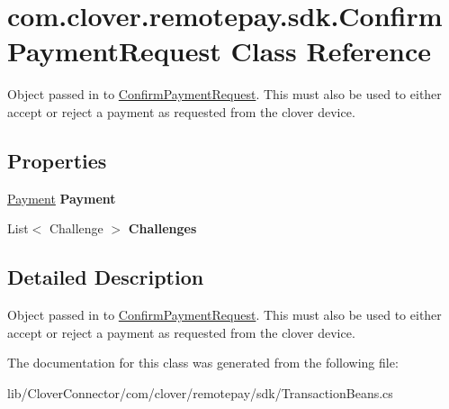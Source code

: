 \hypertarget{classcom_1_1clover_1_1remotepay_1_1sdk_1_1_confirm_payment_request}{}\section{com.\+clover.\+remotepay.\+sdk.\+Confirm\+Payment\+Request Class Reference}
\label{classcom_1_1clover_1_1remotepay_1_1sdk_1_1_confirm_payment_request}


Object passed in to \hyperlink{classcom_1_1clover_1_1remotepay_1_1sdk_1_1_confirm_payment_request}{Confirm\+Payment\+Request}. This must also be used to either accept or reject a payment as requested from the clover device.  


\subsection*{Properties}
\begin{DoxyCompactItemize}
\item 
\mbox{\label{classcom_1_1clover_1_1remotepay_1_1sdk_1_1_confirm_payment_request_ac37c417f349cc5ec5222a8d46ca53a1f}} 
\hyperlink{classcom_1_1clover_1_1sdk_1_1v3_1_1payments_1_1_payment}{Payment} {\bfseries Payment}
\item 
\mbox{\label{classcom_1_1clover_1_1remotepay_1_1sdk_1_1_confirm_payment_request_a6c6a13c89a0eee65abc066295e4ccecd}} 
List$<$ Challenge $>$ {\bfseries Challenges}
\end{DoxyCompactItemize}


\subsection{Detailed Description}
Object passed in to \hyperlink{classcom_1_1clover_1_1remotepay_1_1sdk_1_1_confirm_payment_request}{Confirm\+Payment\+Request}. This must also be used to either accept or reject a payment as requested from the clover device. 



The documentation for this class was generated from the following file\+:\begin{DoxyCompactItemize}
\item 
lib/\+Clover\+Connector/com/clover/remotepay/sdk/Transaction\+Beans.\+cs\end{DoxyCompactItemize}
